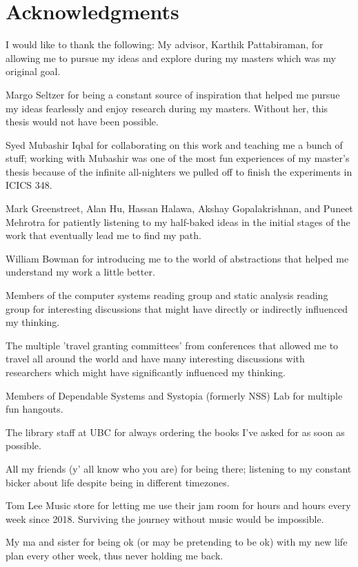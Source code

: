 
\chapter{Acknowledgments}

I would like to thank the following:
My advisor, Karthik Pattabiraman, for allowing me to pursue my ideas and explore during my masters which was my original goal. 

Margo Seltzer for being a constant source of inspiration that helped me pursue my ideas fearlessly and enjoy research during my masters. Without her, this thesis would not have been possible. 

Syed Mubashir Iqbal for collaborating on this work and teaching me a bunch of stuff; working with Mubashir was one of the most fun experiences of my master's thesis because of the infinite all-nighters we pulled off to finish the experiments in ICICS 348. 

Mark Greenstreet, Alan Hu, Hassan Halawa, Akshay Gopalakrishnan, and Puneet Mehrotra for patiently listening to my half-baked ideas in the initial stages of the work that eventually lead me to find my path. 

William Bowman for introducing me to the world of abstractions that helped me understand my work a little better.  

Members of the computer systems reading group and static analysis reading group for interesting discussions that might have directly or indirectly influenced my thinking. 

The multiple 'travel granting committees' from conferences that allowed me to
travel all around the world and have many interesting discussions with researchers which might have significantly influenced my thinking. 

Members of Dependable Systems and Systopia (formerly NSS) Lab for multiple fun hangouts. 

The library staff at UBC for always ordering the books I've asked for as soon as possible.

All my friends (y' all know who you are) for being there; listening to my constant bicker about life despite being in different timezones.   

Tom Lee Music store for letting me use their jam room for hours and hours every week since 2018. Surviving the journey without music would be impossible. 

My ma and sister for being ok (or may be pretending to be ok) with my new life plan every other week, thus never holding me back. 




